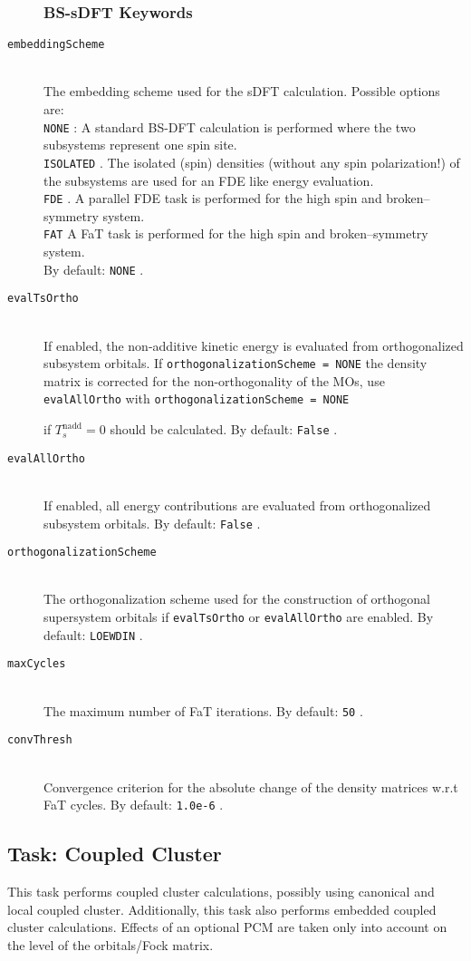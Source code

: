 \documentclass[bibliography=totocnumbered,a4paper,10pt,oneside]{scrbook}
\newcommand{\ttt}[1]{%
  \begingroup\setlength{\fboxsep}{1pt}%
  \colorbox{serenity-green!30}{\texttt{\hspace*{2pt}\vphantom{(g}#1\hspace*{2pt}}}%
  \endgroup
}
\begin{document}
\begin{description}
\subsubsection{BS-sDFT Keywords}
	\item [\texttt{embeddingScheme}]\hfill \\
	The embedding scheme used for the sDFT calculation. Possible options are: \\
    \ttt{NONE}: A standard BS-DFT calculation is performed where the two subsystems 
    represent one spin site.\\
	\ttt{ISOLATED}. The isolated (spin) densities (without any spin polarization!) of the 
	subsystems are used for an FDE like energy evaluation.\\ 
	\ttt{FDE}. A parallel FDE task is performed for the high spin and broken--symmetry
	system.\\ 
	\ttt{FAT} A FaT task is performed for the high spin and broken--symmetry
	system.\\
	By default: \ttt{NONE}.
	\item [\texttt{evalTsOrtho}]\hfill \\
	If enabled, the non-additive kinetic energy is evaluated from orthogonalized subsystem 
	orbitals. If \ttt{orthogonalizationScheme = NONE} the density matrix is corrected for
	the non-orthogonality of the MOs, use \ttt{evalAllOrtho} with \ttt{orthogonalizationScheme = NONE} 
	if $T_s^\text{nadd}=0$ should be calculated. By default: \ttt{False}.
	\item [\texttt{evalAllOrtho}]\hfill \\
	If enabled, all energy contributions are evaluated from orthogonalized subsystem orbitals.
	By default: \ttt{False}.
	\item [\texttt{orthogonalizationScheme}]\hfill \\ The orthogonalization scheme used
	for the construction of orthogonal supersystem orbitals if \ttt{evalTsOrtho} or \ttt{evalAllOrtho} are enabled.
	By default: \ttt{LOEWDIN}.
	\item [\texttt{maxCycles}]\hfill \\ The maximum number of FaT iterations.
	By default: \ttt{50}.
	\item [\texttt{convThresh}]\hfill \\ Convergence criterion for the absolute change
	of the density matrices w.r.t FaT cycles.
	By default: \ttt{1.0e-6}.
\end{description}

\subsection{Task: Coupled Cluster\label{sec:coupledClusterTask}}
This task performs coupled cluster calculations, possibly using canonical and local coupled cluster.
Additionally, this task also performs embedded coupled cluster calculations. Effects of an optional
PCM are taken only into account on the level of the orbitals/Fock matrix.
\end{document}
